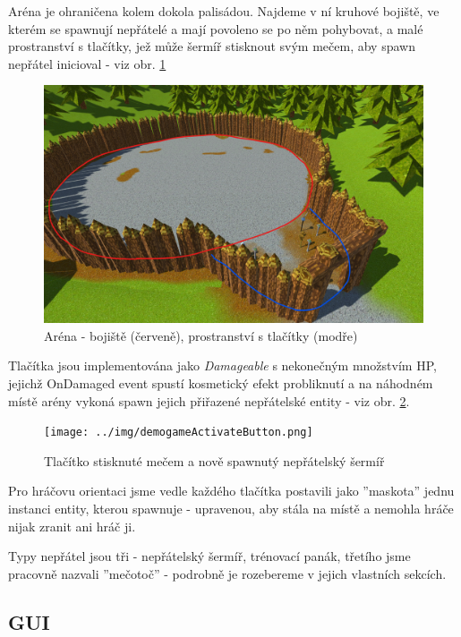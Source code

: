 Aréna je ohraničena kolem dokola palisádou. Najdeme v ní kruhové bojiště, ve kterém se spawnují nepřátelé a mají povoleno se po něm pohybovat, a malé prostranství s tlačítky, jež může šermíř stisknout svým mečem, aby spawn nepřátel inicioval - viz obr. \ref{obr05:demogameArenaLayout} 
\begin{figure}[ht]\centering
  \center
  \includegraphics[width=145mm]{../img/demogameArenaLayout.png}
  \caption{Aréna - bojiště (červeně), prostranství s tlačítky (modře)}
  \label{obr05:demogameArenaLayout}
\end{figure} 

Tlačítka jsou implementována jako \textit{Damageable} s nekonečným množstvím \acs{HP}, jejichž OnDamaged event spustí kosmetický efekt probliknutí a na náhodném místě arény vykoná spawn jejich přiřazené nepřátelské entity - viz obr. \ref{obr05:demogameActivateButton}. 
\begin{figure}[h!]\centering
  \center
  \texttt{[image: ../img/demogameActivateButton.png]}
  \caption{Tlačítko stisknuté mečem a nově spawnutý nepřátelský šermíř}
  \label{obr05:demogameActivateButton}
\end{figure} 

Pro hráčovu orientaci jsme vedle každého tlačítka postavili jako ''maskota'' jednu instanci entity, kterou spawnuje - upravenou, aby stála na místě a nemohla hráče nijak zranit ani hráč ji.

Typy nepřátel jsou tři - nepřátelský šermíř, trénovací panák, třetího jsme pracovně nazvali ''mečotoč'' - podrobně je rozebereme v jejich vlastních sekcích.


\subsection{GUI}

